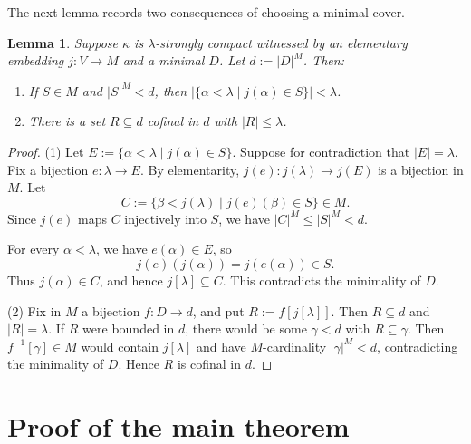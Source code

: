 \documentclass[11pt,reqno]{amsart}
\newtheorem{lemma}[thm]{Lemma}
\theoremstyle{definition}
\theoremstyle{remark}
\renewcommand{\mid}{\mathrel{|}\allowbreak}
\begin{document}
The next lemma records two consequences of choosing a minimal cover.
\begin{lemma}\label{lpullback}
    Suppose $\kappa$ is $\lambda$-strongly compact witnessed by an elementary embedding $j:V\rightarrow M$ and a minimal $D$. Let $d:=|D|^M$. Then:
    \begin{enumerate}
        \item[(1)] If $S\in M$ and $|S|^M< d$, then $|\{\alpha<\lambda\mid j(\alpha)\in S\}|<\lambda$.
        \item[(2)] There is a set $R\subseteq d$ cofinal in $d$ with $|R|\le\lambda$.
    \end{enumerate}
\end{lemma}
\begin{proof}
    (1) Let $E:=\{\alpha<\lambda\mid j(\alpha)\in S\}$.
    Suppose for contradiction that $|E|=\lambda$.
    Fix a bijection $e:\lambda\rightarrow E$.
    By elementarity, $j(e):j(\lambda)\rightarrow j(E)$ is a bijection in $M$.
    Let
    $$C:=\{\beta<j(\lambda)\mid j(e)(\beta)\in S\}\in M.$$
    Since $j(e)$ maps $C$ injectively into $S$, we have $|C|^M\le|S|^M<d$.

    For every $\alpha<\lambda$, we have $e(\alpha)\in E$, so
    $$j(e)(j(\alpha))=j(e(\alpha))\in S.$$
    Thus $j(\alpha)\in C$, and hence $j[\lambda]\subseteq C$.
    This contradicts the minimality of $D$.

    (2) Fix in $M$ a bijection $f:D\rightarrow d$, and put $R:=f[j[\lambda]]$.
    Then $R\subseteq d$ and $|R|=\lambda$.
    If $R$ were bounded in $d$, there would be some $\gamma<d$ with $R\subseteq\gamma$.
    Then $f^{-1}[\gamma]\in M$ would contain $j[\lambda]$ and have $M$-cardinality
    $|\gamma|^M<d$, contradicting the minimality of $D$.
    Hence $R$ is cofinal in $d$.

\end{proof}

\section{Proof of the main theorem}\label{sec:count}
\end{document}
